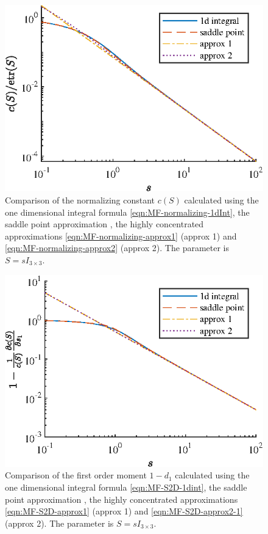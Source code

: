 \begin{figure}
	\centering
	\includegraphics[scale=1.4]{figures/MF-normal-approx1}
	\caption[Comparison of the normalizing constant $c(S)$ calculated using different methods.]{Comparison of the normalizing constant $c(S)$ calculated using the one dimensional integral formula \eqref{eqn:MF-normalizing-1dInt}, the saddle point approximation \cite{kume2005saddlepoint}, the highly concentrated approximations \eqref{eqn:MF-normalizing-approx1} (approx 1) and \eqref{eqn:MF-normalizing-approx2} (approx 2).
	The parameter is $S = sI_{3\times 3}$.
	\label{fig:MF-nomral-approx1}}
\end{figure}

\begin{figure}
	\centering
	\includegraphics[scale=1.4]{figures/MF-S2D-approx1}
	\caption[Comparison of the first order moment $1-d_1$ calculated using different methods.]{Comparison of the first order moment $1-d_1$ calculated using the one dimensional integral formula \eqref{eqn:MF-S2D-1dint}, the saddle point approximation \cite{kume2005saddlepoint,kume2007derivatives}, the highly concentrated approximations \eqref{eqn:MF-S2D-approx1} (approx 1) and \eqref{eqn:MF-S2D-approx2-1} (approx 2).
	The parameter is $S = sI_{3\times 3}$.
	\label{fig:MF-S2D-approx1}}
\end{figure}

